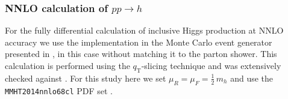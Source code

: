 \subsubsection{NNLO calculation of $pp\to h$}
\label{sec:hjetscomp:tools:fo:sherpa}

For the fully differential calculation of inclusive Higgs production 
at NNLO accuracy we use the implementation in the \Sherpa Monte Carlo 
event generator presented in \cite{Gleisberg:2008ta,Hoche:2014dla}, in 
this case without matching it to the parton shower. This calculation is 
performed using the $q_\text{T}$-slicing technique and was extensively 
checked against \HNNLO \cite{Catani:2007vq}. For this study here we set 
$\mu_R=\mu_F=\tfrac{1}{2}\,m_h$ and use the \texttt{MMHT2014nnlo68cl} 
PDF set \cite{Harland-Lang:2014zoa}. 

